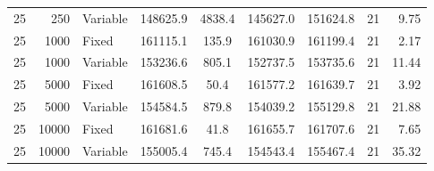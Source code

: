 \begin{table}
\begin{tabular}[t]{rrlcccccr}
25 & 250 & Variable & 148625.9 & 4838.4 & 145627.0 & 151624.8 & 21 & 9.75\\
25 & 1000 & Fixed & 161115.1 & 135.9 & 161030.9 & 161199.4 & 21 & 2.17\\
25 & 1000 & Variable & 153236.6 & 805.1 & 152737.5 & 153735.6 & 21 & 11.44\\
25 & 5000 & Fixed & 161608.5 & 50.4 & 161577.2 & 161639.7 & 21 & 3.92\\
25 & 5000 & Variable & 154584.5 & 879.8 & 154039.2 & 155129.8 & 21 & 21.88\\
25 & 10000 & Fixed & 161681.6 & 41.8 & 161655.7 & 161707.6 & 21 & 7.65\\
25 & 10000 & Variable & 155005.4 & 745.4 & 154543.4 & 155467.4 & 21 & 35.32\\
\bottomrule
\end{tabular}
\end{table}
